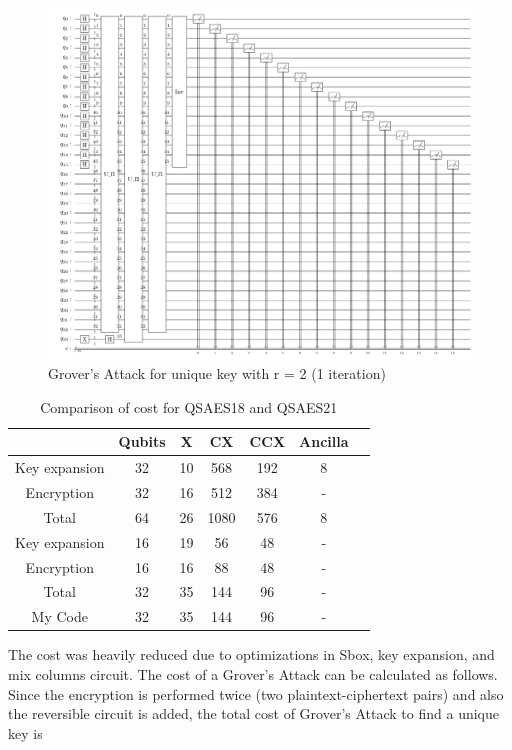 \documentclass[preprint]{transcrypto}
\begin{document}
\begin{figure}[h!]
    \centering
    \includegraphics[width=0.9\linewidth]{saes21/grover-coupling-1-iter.pdf}
    \caption{Grover's Attack for unique key with r = 2 (1 iteration)}
    \label{fig:grov21u}
\end{figure}



\begin{center}
\begin{table}[h!]
    \centering
    \begin{tabular}{ |c|c|c|c|c|c|c| } 
     \hline
       & Qubits & X & CX & CCX & Ancilla \\ \hline
     Key expansion & 32 & 10& 568 & 192 & 8 \\ \hline
     Encryption & 32 & 16 & 512 & 384 & - \\ \hline
     Total & 64 & 26 & 1080 & 576 & 8 \\ \hline
     Key expansion & 16 & 19& 56 & 48 & - \\ \hline
     Encryption & 16 & 16 & 88 & 48 & - \\ \hline
     Total & 32 & 35 & 144 & 96 & - \\ \hline
     My Code & 32 & 35 & 144 & 96 & - \\ \hline
    \end{tabular}
    \caption{Comparison of cost for QSAES18\cite{Almazrooie} and QSAES21\cite{Jang} }
    \label{tab:cost21}
\end{table}
\end{center}

The cost was heavily reduced due to optimizations in Sbox, key expansion, and mix columns circuit. The cost of a Grover's Attack can be calculated as follows. Since the encryption is performed twice (two plaintext-ciphertext pairs) and also the reversible circuit is added, the total cost of Grover's Attack to find a unique key is
\end{document}
